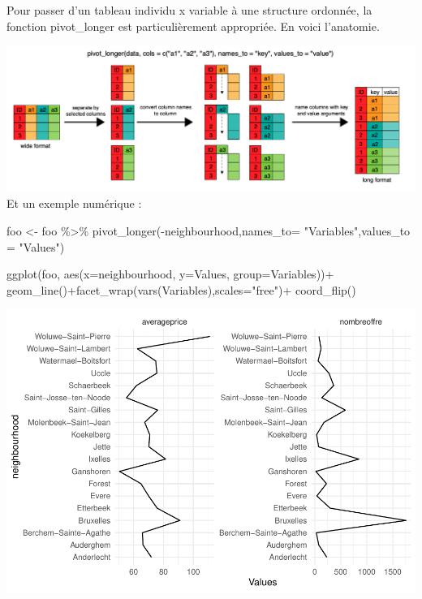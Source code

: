 \documentclass[
]{book}
\newenvironment{Shaded}{\begin{snugshade}}{\end{snugshade}}
\newcommand{\AttributeTok}[1]{\textcolor[rgb]{0.77,0.63,0.00}{#1}}
\newcommand{\FunctionTok}[1]{\textcolor[rgb]{0.00,0.00,0.00}{#1}}
\newcommand{\NormalTok}[1]{#1}
\newcommand{\OtherTok}[1]{\textcolor[rgb]{0.56,0.35,0.01}{#1}}
\newcommand{\SpecialCharTok}[1]{\textcolor[rgb]{0.00,0.00,0.00}{#1}}
\newcommand{\StringTok}[1]{\textcolor[rgb]{0.31,0.60,0.02}{#1}}
\begin{document}
Pour passer d'un tableau individu x variable à une structure ordonnée, la fonction pivot\_longer est particulièrement appropriée. En voici l'anatomie.

\includegraphics{./Images/pivot_longer.png}
Et un exemple numérique :

\begin{Shaded}
\begin{Highlighting}[]
\NormalTok{foo }\OtherTok{\textless{}{-}}\NormalTok{ foo }\SpecialCharTok{\%\textgreater{}\%}
  \FunctionTok{pivot\_longer}\NormalTok{(}\SpecialCharTok{{-}}\NormalTok{neighbourhood,}\AttributeTok{names\_to=} \StringTok{"Variables"}\NormalTok{,}\AttributeTok{values\_to =} \StringTok{"Values"}\NormalTok{)}

\FunctionTok{ggplot}\NormalTok{(foo, }\FunctionTok{aes}\NormalTok{(}\AttributeTok{x=}\NormalTok{neighbourhood, }\AttributeTok{y=}\NormalTok{Values, }\AttributeTok{group=}\NormalTok{Variables))}\SpecialCharTok{+}
  \FunctionTok{geom\_line}\NormalTok{()}\SpecialCharTok{+}\FunctionTok{facet\_wrap}\NormalTok{(}\FunctionTok{vars}\NormalTok{(Variables),}\AttributeTok{scales=}\StringTok{"free"}\NormalTok{)}\SpecialCharTok{+}
  \FunctionTok{coord\_flip}\NormalTok{()}
\end{Highlighting}
\end{Shaded}

\includegraphics{bookdown-demo_files/figure-latex/0208-1.pdf}
\end{document}
